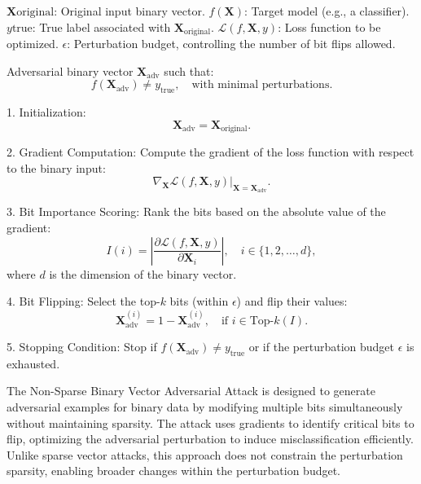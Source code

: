 $\mathbf{X}{\text{original}}$: Original input binary vector.
$f(\mathbf{X})$: Target model (e.g., a classifier).
$y{\text{true}}$: True label associated with $\mathbf{X}_{\text{original}}$.
$\mathcal{L}(f, \mathbf{X}, y)$: Loss function to be optimized.
$\epsilon$: Perturbation budget, controlling the number of bit flips allowed.

Adversarial binary vector $\mathbf{X}_{\text{adv}}$ such that:  
\[
f(\mathbf{X}_{\text{adv}}) \neq y_{\text{true}}, \quad \text{with minimal perturbations}.
\]

1. Initialization:  
   \[
   \mathbf{X}_{\text{adv}} = \mathbf{X}_{\text{original}}.
   \]

2. Gradient Computation:  
   Compute the gradient of the loss function with respect to the binary input:  
   \[
   \nabla_{\mathbf{X}} \mathcal{L}(f, \mathbf{X}, y) \big|_{\mathbf{X} = \mathbf{X}_{\text{adv}}}.
   \]

3. Bit Importance Scoring:  
   Rank the bits based on the absolute value of the gradient:  
   \[
   I(i) = \left| \frac{\partial \mathcal{L}(f, \mathbf{X}, y)}{\partial \mathbf{X}_i} \right|, \quad i \in \{1, 2, \ldots, d\},
   \]
   where $d$ is the dimension of the binary vector.

4. Bit Flipping:  
   Select the top-$k$ bits (within $\epsilon$) and flip their values:  
   \[
   \mathbf{X}_{\text{adv}}^{(i)} = 1 - \mathbf{X}_{\text{adv}}^{(i)}, \quad \text{if } i \in \text{Top-}k(I).
   \]

5. Stopping Condition:  
   Stop if $f(\mathbf{X}_{\text{adv}}) \neq y_{\text{true}}$ or if the perturbation budget $\epsilon$ is exhausted.


The Non-Sparse Binary Vector Adversarial Attack is designed to generate adversarial examples for binary data by modifying multiple bits simultaneously without maintaining sparsity. The attack uses gradients to identify critical bits to flip, optimizing the adversarial perturbation to induce misclassification efficiently. Unlike sparse vector attacks, this approach does not constrain the perturbation sparsity, enabling broader changes within the perturbation budget.